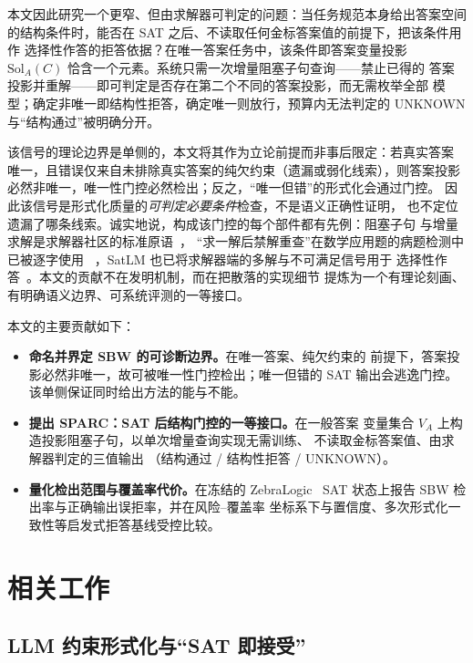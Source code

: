 \documentclass[letterpaper]{article}
\newcommand{\method}{SPARC}
\newcommand{\sbw}{SBW}
\newcommand{\AnsSol}{\mathrm{Sol}_{A}}
\begin{document}
本文因此研究一个更窄、但由求解器可判定的问题：当任务规范本身给出答案空间
的结构条件时，能否在 SAT 之后、不读取任何金标答案值的前提下，把该条件用作
选择性作答的拒答依据？在唯一答案任务中，该条件即答案变量投影
$\AnsSol(C)$ 恰含一个元素。系统只需一次增量阻塞子句查询——禁止已得的
答案投影并重解——即可判定是否存在第二个不同的答案投影，而无需枚举全部
模型；确定非唯一即结构性拒答，确定唯一则放行，预算内无法判定的
UNKNOWN 与``结构通过''被明确分开。

该信号的理论边界是单侧的，本文将其作为立论前提而非事后限定：若真实答案
唯一，且错误仅来自未排除真实答案的纯欠约束（遗漏或弱化线索），则答案投影
必然非唯一，唯一性门控必然检出；反之，``唯一但错''的形式化会通过门控。
因此该信号是形式化质量的\emph{可判定必要条件}检查，不是语义正确性证明，
也不定位遗漏了哪条线索。诚实地说，构成该门控的每个部件都有先例：阻塞子句
与增量求解是求解器社区的标准原语~\cite{mcmillan2002,eensorensson2004}，
``求一解后禁解重查''在数学应用题的病题检测中已被逐字使用
~\cite{tian2025vcsearch}，SatLM 也已将求解器端的多解与不可满足信号用于
选择性作答~\cite{ye2023}。本文的贡献不在发明机制，而在把散落的实现细节
提炼为一个有理论刻画、有明确语义边界、可系统评测的一等接口。

本文的主要贡献如下：
\begin{itemize}
  \item \textbf{命名并界定 \sbw{} 的可诊断边界。}在唯一答案、纯欠约束的
        前提下，答案投影必然非唯一，故可被唯一性门控检出；唯一但错的
        SAT 输出会逃逸门控。该单侧保证同时给出方法的能与不能。
  \item \textbf{提出 \method{}：SAT 后结构门控的一等接口。}在一般答案
        变量集合 $V_A$ 上构造投影阻塞子句，以单次增量查询实现无需训练、
        不读取金标答案值、由求解器判定的三值输出
        （结构通过 / 结构性拒答 / UNKNOWN）。
  \item \textbf{量化检出范围与覆盖率代价。}在冻结的 ZebraLogic~\cite{lin2025}
        SAT 状态上报告 \sbw{} 检出率与正确输出误拒率，并在风险--覆盖率
        坐标系下与置信度、多次形式化一致性等启发式拒答基线受控比较。
\end{itemize}

\section{相关工作}
\label{sec:related}

\subsection{LLM 约束形式化与``SAT 即接受''}
\label{sec:rw-formalization}
\end{document}
